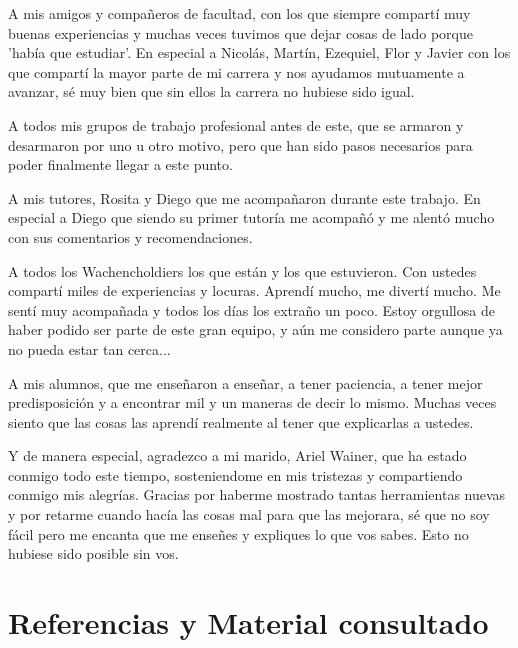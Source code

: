 \documentclass[a4paper]{article}
\begin{document}
A mis amigos y compañeros de facultad, con los que siempre compartí muy buenas experiencias y muchas veces tuvimos que dejar cosas de lado porque 'había que estudiar'. En especial a Nicolás, Martín, Ezequiel, Flor y Javier con los que compartí la mayor parte de mi carrera y nos ayudamos mutuamente a avanzar, sé muy bien que sin ellos la carrera no hubiese sido igual.

A todos mis grupos de trabajo profesional antes de este, que se armaron y desarmaron por uno u otro motivo, pero que han sido pasos necesarios para poder finalmente llegar a este punto.

A mis tutores, Rosita y Diego que me acompañaron durante este trabajo. En especial a Diego que siendo su primer tutoría me acompañó y me alentó mucho con sus comentarios y recomendaciones.

A todos los Wachencholdiers los que están y los que estuvieron. Con ustedes compartí miles de experiencias y locuras. Aprendí mucho, me divertí mucho. Me sentí muy acompañada y todos los días los extraño un poco. Estoy orgullosa de haber podido ser parte de este gran equipo, y aún me considero parte aunque ya no pueda estar tan cerca...

A mis alumnos, que me enseñaron a enseñar, a tener paciencia, a tener mejor predisposición y a encontrar mil y un maneras de decir lo mismo. Muchas veces siento que las cosas las aprendí realmente al tener que explicarlas a ustedes.

Y de manera especial, agradezco a mi marido, Ariel Wainer, que ha estado conmigo todo este tiempo, sosteniendome en mis tristezas y compartiendo conmigo mis alegrías. Gracias por haberme mostrado tantas herramientas nuevas y por retarme cuando hacía las cosas mal para que las mejorara, sé que no soy fácil pero me encanta que me enseñes y expliques lo que vos sabes. Esto no hubiese sido posible sin vos.


\newpage
\section{Referencias y Material consultado}

\renewcommand\refname{\small}
\end{document}
